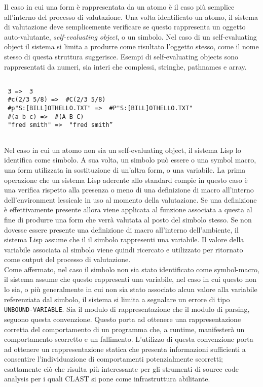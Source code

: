 Il caso in cui una form è rappresentata da un atomo è il caso più semplice all’interno del processo di valutazione. Una volta identificato un atomo, il sistema di valutazione deve semplicemente verificare se questo rappresenta un oggetto auto-valutante, \textit{self-evaluating object}, o un simbolo. Nel caso di un self-evaluating object il sistema si limita a produrre come risultato l’oggetto stesso, come il nome stesso di questa struttura suggerisce. Esempi di self-evaluating objects sono rappresentati da numeri, sia interi che complessi, stringhe, pathnames e array.\\

\begin{lstlisting}

 3 =>  3
 #c(2/3 5/8) =>  #C(2/3 5/8)
 #p"S:[BILL]OTHELLO.TXT" =>  #P"S:[BILL]OTHELLO.TXT"
 #(a b c) =>  #(A B C)
 "fred smith" =>  "fred smith”
 
 \end{lstlisting}

Nel caso in cui un atomo non sia un self-evaluating object, il sistema Lisp lo identifica come simbolo. A sua volta, un simbolo può essere o una symbol macro, una form utilizzata in sostituzione di un’altra form, o una variabile. La prima operazione che un sistema Lisp aderente allo standard compie in questo caso è una verifica rispetto alla presenza o meno di una definizione di macro all’interno dell’environment lessicale in uso al momento della valutazione. Se una definizione è effettivamente presente allora viene applicata al funzione associata a questa al fine di produrre una form che verrà valutata al posto del simbolo stesso. Se non dovesse essere presente una definizione di macro all’interno dell’ambiente, il sistema Lisp assume che il il simbolo rappresenti una variabile. Il valore della variabile associata al simbolo viene quindi ricercato e utilizzato per ritornato come output del processo di valutazione.\\

Come affermato, nel caso il simbolo non sia stato identificato come symbol-macro, il sistema assume che questo rappresenti una variabile, nel caso in cui questo non lo sia, o più generalmente in cui non sia stato associato alcun valore alla variabile referenziata dal simbolo, il sistema si limita a segnalare un errore di tipo \texttt{UNBOUND-VARIABLE}. Sia il modulo di rappresentazione che il modulo di parsing, seguono questa convenzione. Questo porta ad ottenere una rappresentazione corretta del comportamento di un programma che, a runtime, manifesterà un comportamento scorretto e un fallimento. L’utilizzo di questa convenzione porta ad ottenere un rappresentazione statica che presenta informazioni sufficienti a consentire l’individuazione di comportamenti potenzialmente scorretti; esattamente ciò che risulta più interessante per gli strumenti di source code analysis per i quali CLAST si pone come infrastruttura abilitante.\\

